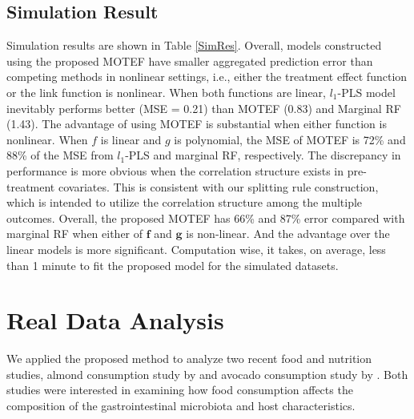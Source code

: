 \documentclass[smallextended]{svjour3}
\begin{document}
\subsection{Simulation Result}\label{3.2}
Simulation results are shown in Table \ref{SimRes}. Overall, models constructed using the proposed MOTEF have smaller aggregated prediction error than competing methods in nonlinear settings, i.e., either the treatment effect function or the link function is nonlinear. When both functions are linear, $l_1$-PLS model inevitably performs better (MSE = 0.21) than MOTEF (0.83) and Marginal RF (1.43). The advantage of using MOTEF is substantial when either function is nonlinear. When $f$ is linear and $g$ is polynomial, the MSE of MOTEF is 72\% and 88\% of the MSE from $l_1$-PLS and marginal RF, respectively. The discrepancy in performance is more obvious when the correlation structure exists in pre-treatment covariates. This is consistent with our splitting rule construction, which is intended to utilize the correlation structure among the multiple outcomes. Overall, the proposed MOTEF has 66\% and 87\% error compared with marginal RF when either of $\bm f$ and $\bm g$ is non-linear. And the advantage over the linear models is more significant. Computation wise, it takes, on average, less than 1 minute to fit the proposed model for the simulated datasets. 


\section{Real Data Analysis}\label{realdata}
We applied the proposed method to analyze two recent food and nutrition studies, almond consumption study by \citet{holscher2018almond} and avocado consumption study by \citet{Avocado}. Both studies were interested in examining how food consumption affects the composition of the gastrointestinal microbiota and host characteristics. 
\end{document}
